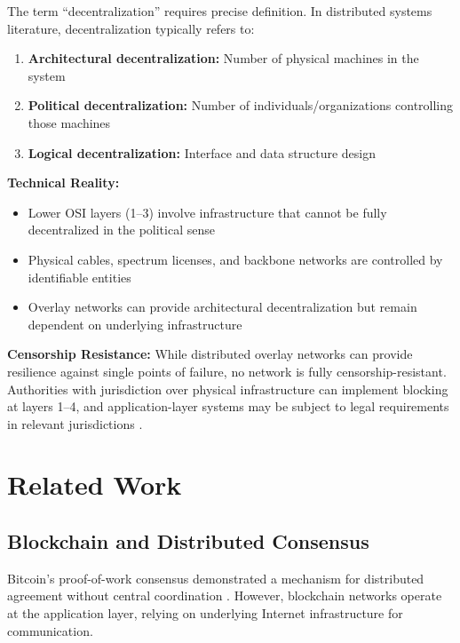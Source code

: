 \documentclass[11pt,a4paper]{article}
\begin{document}
The term ``decentralization'' requires precise definition. In distributed systems literature, decentralization typically refers to:

\begin{enumerate}
    \item \textbf{Architectural decentralization:} Number of physical machines in the system
    \item \textbf{Political decentralization:} Number of individuals/organizations controlling those machines
    \item \textbf{Logical decentralization:} Interface and data structure design \citep{buterin2017}
\end{enumerate}

\textbf{Technical Reality:}
\begin{itemize}[leftmargin=*]
    \item Lower OSI layers (1--3) involve infrastructure that cannot be fully decentralized in the political sense
    \item Physical cables, spectrum licenses, and backbone networks are controlled by identifiable entities
    \item Overlay networks can provide architectural decentralization but remain dependent on underlying infrastructure
\end{itemize}

\textbf{Censorship Resistance:}
While distributed overlay networks can provide resilience against single points of failure, no network is fully censorship-resistant. Authorities with jurisdiction over physical infrastructure can implement blocking at layers 1--4, and application-layer systems may be subject to legal requirements in relevant jurisdictions \citep{clayton2006}.

\section{Related Work}

\subsection{Blockchain and Distributed Consensus}

Bitcoin's proof-of-work consensus demonstrated a mechanism for distributed agreement without central coordination \citep{nakamoto2008}. However, blockchain networks operate at the application layer, relying on underlying Internet infrastructure for communication.
\end{document}

